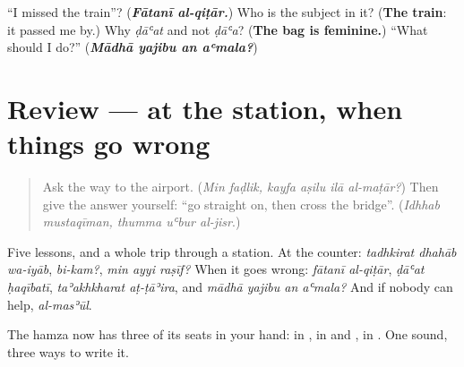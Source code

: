 \begin{tcolorbox}[breakable,colback=teal!4,colframe=teal!35!black,title={Before you move on}]
\textquotedblleft{}I missed the train\textquotedblright{}? (\emph{\textbf{Fātanī al-qiṭār.}}) Who is the subject in it? (\textbf{The train}: it passed me by.) Why \emph{ḍāʿat} and not \emph{ḍāʿa}? (\textbf{The bag is feminine.}) \textquotedblleft{}What should I do?\textquotedblright{} (\emph{\textbf{Mādhā yajibu an aʿmala?}})
\end{tcolorbox}
\section[(review)]{Review — at the station, when things go wrong}

\label{lesson:AR-R288-at-the-station}



\begin{quote}
Ask the way to the airport. (\emph{Min faḍlik, kayfa aṣilu ilā al-maṭār?}) Then give the answer yourself: \textquotedblleft{}go straight on, then cross the bridge\textquotedblright{}. (\emph{Idhhab mustaqīman, thumma uʿbur al-jisr}.)
\end{quote}

\begin{grammarlens}[title={What you've built}]
Five lessons, and a whole trip through a station. At the counter: \emph{tadhkirat dhahāb wa-iyāb}, \emph{bi-kam?}, \emph{min ayyi raṣīf?} When it goes wrong: \emph{fātanī al-qiṭār}, \emph{ḍāʿat ḥaqībatī}, \emph{taʾakhkharat aṭ-ṭāʾira}, and \emph{mādhā yajibu an aʿmala?} And if nobody can help, \emph{al-masʾūl}.

The hamza now has three of its seats in your hand: \textbf{} in \textbf{}, \textbf{} in \textbf{} and \textbf{}, \textbf{} in \textbf{}. One sound, three ways to write it.
\end{grammarlens}


